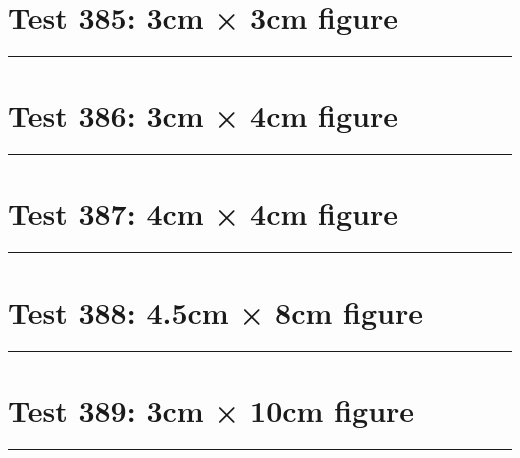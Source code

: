\documentclass[a4paper,11pt]{article}
\begin{document}
\section*{Test 385: 3cm × 3cm figure}
\begin{swarmwrap}%
  \begin{minipage}[t]{3cm}
    \centering
    \rule{\linewidth}{3cm}
  \end{minipage}%
\end{swarmwrap}%
\swarmwrapnext
\lipsum[74]
\lipsum[75]
\lipsum[76]
\lipsum[77]
\lipsum[78]
\lipsum[79]
\section*{Test 386: 3cm × 4cm figure}
\begin{swarmwrap}%
  \begin{minipage}[t]{3cm}
    \centering
    \rule{\linewidth}{4cm}
  \end{minipage}%
\end{swarmwrap}%
\swarmwrapnext
\lipsum[22]
\lipsum[23]
\lipsum[24]
\lipsum[25]
\lipsum[26]
\section*{Test 387: 4cm × 4cm figure}
\begin{swarmwrap}%
  \begin{minipage}[t]{4cm}
    \centering
    \rule{\linewidth}{4cm}
  \end{minipage}%
\end{swarmwrap}%
\swarmwrapnext
\lipsum[81]
\lipsum[82]
\lipsum[83]
\lipsum[84]
\lipsum[85]
\section*{Test 388: 4.5cm × 8cm figure}
\begin{swarmwrap}%
  \begin{minipage}[t]{4cm}
    \centering
    \rule{\linewidth}{8cm}
  \end{minipage}%
\end{swarmwrap}%
\swarmwrapnext
\lipsum[23]
\lipsum[24]
\lipsum[25]
\lipsum[26]
\section*{Test 389: 3cm × 10cm figure}
\begin{swarmwrap}%
  \begin{minipage}[t]{3cm}
    \centering
    \rule{\linewidth}{10cm}
  \end{minipage}%
\end{swarmwrap}%
\swarmwrapnext
\lipsum[86]
\lipsum[87]
\lipsum[88]
\lipsum[89]
\lipsum[90]
\lipsum[91]
\end{document}
